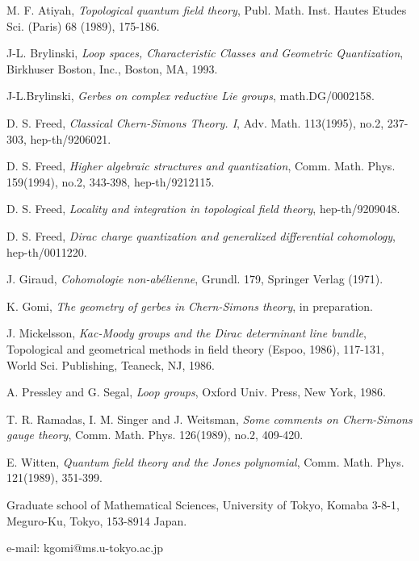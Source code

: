 \documentclass[a4paper,a4paper]{article}
\theoremstyle{definition}
\theoremstyle{remark}
\begin{document}
\begin{thebibliography}{999}

M. F. Atiyah, 
\textit{Topological quantum field theory}, 
Publ. Math. Inst. Hautes Etudes Sci. (Paris) 68 (1989), 175-186.

J-L. Brylinski,
\textit{Loop spaces, Characteristic Classes and Geometric Quantization},
Birkh\coordHE{}user Boston, Inc., Boston, MA, 1993.

J-L.Brylinski,
\textit{Gerbes on complex reductive Lie groups},
math.DG/0002158.

D. S. Freed,
\textit{Classical Chern-Simons Theory. I},
Adv. Math. 113(1995), no.2, 237-303,
hep-th/9206021.

D. S. Freed,
\textit{Higher algebraic structures and quantization},
Comm. Math. Phys. 159(1994), no.2, 343-398,
hep-th/9212115.

D. S. Freed,
\textit{Locality and integration in topological field theory},
hep-th/9209048.

D. S. Freed,
\textit{Dirac charge quantization and generalized differential cohomology},
hep-th/0011220.

J. Giraud,
\textit{Cohomologie  non-ab\'elienne},
Grundl. 179, Springer Verlag (1971).

K. Gomi,
\textit{The geometry of gerbes in Chern-Simons theory},
in preparation.

J. Mickelsson,
\textit{Kac-Moody groups and the Dirac determinant line bundle},
Topological and geometrical methods in field theory (Espoo, 1986), 117-131, World Sci. Publishing, Teaneck, NJ, 1986.

A. Pressley and G. Segal,
\textit{Loop groups},
Oxford Univ. Press, New York, 1986.

T. R. Ramadas, I. M. Singer and J. Weitsman,
\textit{Some comments on Chern-Simons gauge theory},
Comm. Math. Phys. 126(1989), no.2, 409-420.

E. Witten,
\textit{Quantum field theory and the Jones polynomial},
Comm. Math. Phys. 121(1989), 351-399.

\end{thebibliography}

Graduate school of Mathematical Sciences, 
University of Tokyo, Komaba 3-8-1, Meguro-Ku, Tokyo, 153-8914 Japan.

e-mail: kgomi@ms.u-tokyo.ac.jp
\end{document}
